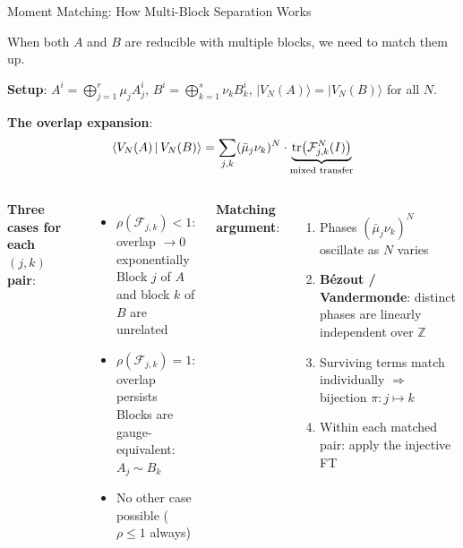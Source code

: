 \documentclass[aspectratio=169,10pt]{beamer}
\begin{document}
\begin{frame}{Moment Matching: How Multi-Block Separation Works}
    \vspace{-0.8em}

    {\small When both $A$ and $B$ are reducible with multiple blocks,
    we need to match them up.}

    \vspace{0.1em}
    \textbf{Setup}: $A^i = \bigoplus_{j=1}^r \mu_j A_j^i$, \;
    $B^i = \bigoplus_{k=1}^s \nu_k B_k^i$, \;
    $|V_N(A)\rangle = |V_N(B)\rangle$ for all $N$.

    \vspace{0.1em}
    \textbf{The overlap expansion}:
    \vspace{-0.5em}
    \[
        \langle V_N(A)\,|\,V_N(B)\rangle
        = \sum_{j,k} (\bar\mu_j \nu_k)^N \cdot
        \underbrace{\mathrm{tr}\bigl(\mathcal{F}_{j,k}^N(I)\bigr)}_{\text{mixed transfer}}
    \]

    \vspace{-0.4em}
    \begin{columns}[T]
        \textbf{Three cases for each $(j,k)$ pair}:
        \begin{itemize}\itemsep0em\small
            \item[\textcolor{leangreen}{$\checkmark$}] $\rho(\mathcal{F}_{j,k}) < 1$:
                overlap $\to 0$ exponentially\\
                {\tiny Block $j$ of $A$ and block $k$ of $B$ are unrelated}
            \item[\textcolor{leanblue}{$\circ$}] $\rho(\mathcal{F}_{j,k}) = 1$:
                overlap persists\\
                {\tiny Blocks are gauge-equivalent: $A_j \sim B_k$}
            \item[\textcolor{softred}{$\times$}] No other case possible
                ($\rho \leq 1$ always)
        \end{itemize}

        \textbf{Matching argument}:
        \begin{enumerate}\itemsep0em\small
            \item Phases $(\bar\mu_j\nu_k)^N$
                oscillate as $N$ varies
            \item \textbf{B\'ezout / Vandermonde}: distinct phases are
                linearly independent over $\mathbb{Z}$
            \item Surviving terms match individually
                $\Rightarrow$ bijection $\pi: j \mapsto k$
            \item Within each matched pair: apply the
                \textcolor{leangreen}{injective FT}
        \end{enumerate}
    \end{columns}


\end{frame}
\end{document}
